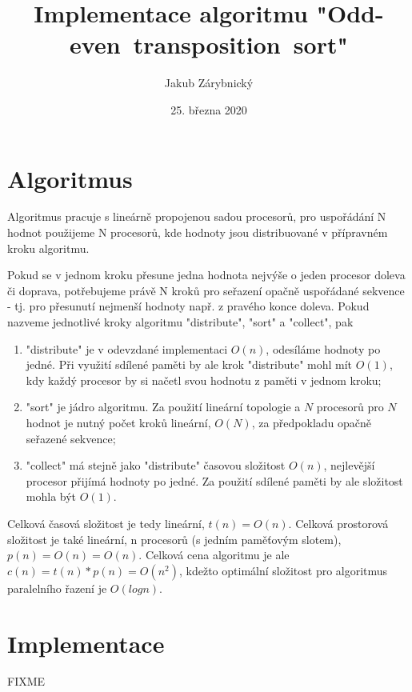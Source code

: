\documentclass[11pt]{article}
\author{Jakub Zárybnický}
\date{25. března 2020}
\title{Implementace algoritmu "Odd-even~transposition~sort"}
\begin{document}
\maketitle

\section{Algoritmus}
\label{sec:orgd334b42}
Algoritmus pracuje s lineárně propojenou sadou procesorů, pro uspořádání N
hodnot použijeme N procesorů, kde hodnoty jsou distribuované v přípravném kroku
algoritmu.

Pokud se v jednom kroku přesune jedna hodnota nejvýše o jeden procesor doleva či
doprava, potřebujeme právě N kroků pro seřazení opačně uspořádané sekvence -
tj. pro přesunutí nejmenší hodnoty např. z pravého konce doleva. Pokud nazveme
jednotlivé kroky algoritmu "distribute", "sort" a "collect", pak
\begin{enumerate}
\item "distribute" je v odevzdané implementaci \(O(n)\), odesíláme hodnoty po
jedné. Při využití sdílené paměti by ale krok "distribute" mohl mít \(O(1)\),
kdy každý procesor by si načetl svou hodnotu z paměti v jednom kroku;
\item "sort" je jádro algoritmu. Za použití lineární topologie a \(N\) procesorů pro
\(N\) hodnot je nutný počet kroků lineární, \(O(N)\), za předpokladu opačně
seřazené sekvence;
\item "collect" má stejně jako "distribute" časovou složitost \(O(n)\), nejlevější
procesor přijímá hodnoty po jedné. Za použití sdílené paměti by ale
složitost mohla být \(O(1)\).
\end{enumerate}

Celková časová složitost je tedy lineární, \(t(n) = O(n)\). Celková prostorová
složitost je také lineární, n procesorů (s jedním paměťovým slotem), \(p(n) =
O(n) = O(n)\). Celková cena algoritmu je ale \(c(n) = t(n) * p(n) = O(n^2)\),
kdežto optimální složitost pro algoritmus paralelního řazení je \(O(log n)\).

\section{Implementace}
\label{sec:org82630c7}
FIXME
\end{document}
